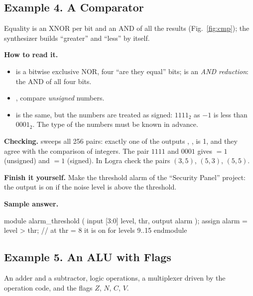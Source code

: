 \subsection{Example 4. A Comparator}

Equality is an XNOR per bit and an AND of all the results
(Fig.~\ref{fig:cmp}); the synthesizer builds ``greater'' and ``less'' by itself.


\textbf{How to read it.}
\begin{itemize}
  \item {} is a bitwise exclusive NOR, four ``are they equal'' bits; \code{\&(\ldots)} is an \emph{AND reduction}: the AND of all four bits.
  \item {},  compare \emph{unsigned} numbers.
  \item {} is the same, but the numbers are treated as signed: $1111_2$ as $-1$ is less than $0001_2$. The type of the numbers must be known in advance.
\end{itemize}
\textbf{Checking.}  sweeps all 256 pairs: exactly one of
the outputs , ,  is 1, and they agree with the
comparison of integers. The pair $1111$ and $0001$ gives $=1$
(unsigned) and $=1$ (signed). In Logra check the pairs
$(3,5)$, $(5,3)$, $(5,5)$.

\textbf{Finish it yourself.} Make the threshold alarm of the ``Security Panel''
project: the output is on if the noise level is above the threshold.

\textbf{Sample answer.}
\begin{vcode}
module alarm_threshold (
    input  [3:0] level, thr,
    output       alarm
);
    assign alarm = level > thr;   // at thr = 8 it is on for levels 9..15
endmodule
\end{vcode}

\subsection{Example 5. An ALU with Flags}

An adder and a subtractor, logic operations, a multiplexer driven by the
operation code, and the flags $Z$, $N$, $C$, $V$.


